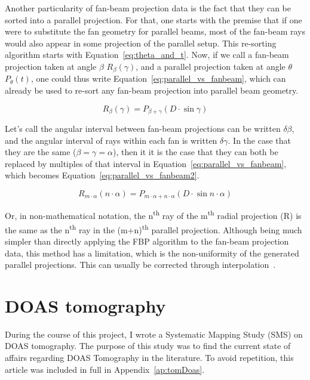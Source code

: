 Another particularity of fan-beam projection data is the fact that they
can be sorted into a parallel projection. For that, one starts with the
premise that if one were to substitute the fan geometry for parallel
beams, most of the fan-beam rays would also appear in some projection of
the parallel setup. This re-sorting algorithm starts with
Equation~\ref{eq:theta_and_t}. Now, if we call a fan-beam projection
taken at angle $\beta$ $R_{\beta}(\gamma)$, and a parallel projection
taken at angle $\theta$ $P_{\theta}(t)$, one could thus write
Equation~\ref{eq:parallel_vs_fanbeam}, which can already be used to
re-sort any fan-beam projection into parallel beam geometry.

\begin{equation}
    \label{eq:parallel_vs_fanbeam}
    R_{\beta}(\gamma) = P_{\beta + \gamma}(D \cdot \sin \gamma)
\end{equation}

Let's call the angular interval between fan-beam projections can be
written $\delta\beta$, and the angular interval of rays within each fan
is written $\delta\gamma$. In the case that they are the same
($\beta=\gamma=\alpha$), then it it is the case that they can both be
replaced by multiples of that interval in
Equation~\ref{eq:parallel_vs_fanbeam}, which becomes
Equation~\ref{eq:parallel_vs_fanbeam2}.

\begin{equation}
    \label{eq:parallel_vs_fanbeam2}
    R_{m \cdot \alpha}(n \cdot\alpha) = P_{m \cdot\alpha + n
    \cdot\alpha}(D \cdot \sin n \cdot\alpha)
\end{equation}

Or, in non-mathematical notation, the n\textsuperscript{th} ray of the
m\textsuperscript{th} radial projection (R) is the same as the
n\textsuperscript{th} ray in the (m+n)\textsuperscript{th} parallel
projection. Although being much simpler than directly applying the
\gls{FBP} algorithm to the fan-beam projection data, this method has a
limitation, which is the non-uniformity of the generated parallel
projections. This can usually be corrected through
interpolation~\cite{Kak2001a}. 

\section{DOAS tomography}%
\label{sec:doas_tomography}

During the course of this project, I wrote a Systematic Mapping Study
(\gls{SMS}) on DOAS tomography. The purpose of this study was to find
the current state of affairs regarding DOAS Tomography in the
literature. To avoid repetition, this article was included in full in
Appendix~\ref{ap:tomDoas}.



